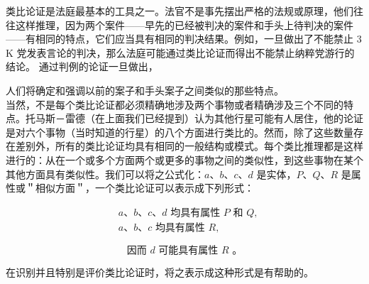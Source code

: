 类比论证是法庭最基本的工具之一。法官不是事先摆出严格的法规或原理，他们往往这样推理，因为两个案件——早先的已经被判决的案件和手头上待判决的案件——有相同的特点，它们应当具有相同的判决结果。例如，一旦做出了不能禁止 3 K 党发表言论的判决，那么法庭可能通过类比论证而得出不能禁止纳粹党游行的结论。\cite{collin1978} 通过判例的论证一旦做出，

人们将确定和强调以前的案子和手头案子之间类似的那些特点。\\
当然，不是每个类比论证都必须精确地涉及两个事物或者精确涉及三个不同的特点。托马斯－雷德（在上面我们已经提到）认为其他行星可能有人居住，他的论证是对六个事物（当时知道的行星）的八个方面进行类比的。然而，除了这些数量存在差别外，所有的类比论证均具有相同的一般结构或模式。每个类比推理都是这样进行的：从在一个或多个方面两个或更多的事物之间的类似性，到这些事物在某个其他方面具有类似性。我们可以将之公式化：$a 、 b 、 c 、 d$ 是实体，$P 、 Q 、 R$ 是属性或＂相似方面＂，一个类比论证可以表示成下列形式：

$$
\begin{aligned}
& a 、 b 、 c 、 d \text { 均具有属性 } P \text { 和 } Q, \\
& a 、 b 、 c \text { 均具有属性 } R,
\end{aligned}
$$

$$
\text { 因而 } d \text { 可能具有属性 } R \text { 。 }
$$

在识别并且特别是评价类比论证时，将之表示成这种形式是有帮助的。

